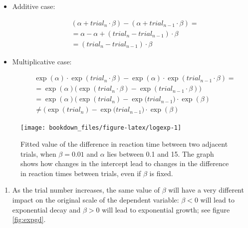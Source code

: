 \documentclass[12pt,]{krantz}
\providecommand{\tightlist}{%
  \setlength{\itemsep}{0pt}\setlength{\parskip}{0pt}}
\theoremstyle{definition}
\theoremstyle{definition}
\theoremstyle{definition}
\theoremstyle{remark}
\begin{document}
\begin{itemize}
\item
  Additive case:

  \begin{equation}
   \begin{aligned}
   & (\alpha + trial_n \cdot \beta) - (\alpha + trial_{n-1} \cdot \beta) = \\
   &=\alpha -\alpha + ( trial_n - trial_{n-1} ) \cdot \beta\\
   &= ( trial_n - trial_{n-1} ) \cdot \beta
   \end{aligned}
   \end{equation}
\item
  Multiplicative case:

  \begin{equation}
   \begin{aligned}
      &\exp(\alpha) \cdot \exp(trial_n \cdot \beta) -\exp(\alpha) \cdot \exp(trial_{n-1} \cdot \beta) =\\ 
      &= \exp(\alpha) \big(\exp(trial_n  \cdot \beta)  - \exp(trial_{n-1}\cdot \beta) \big)\\
      &= \exp(\alpha) \big(\exp(trial_n)  - \exp(trial_{n-1}  \big) \cdot \exp(\beta)\\
      &\neq \big(\exp(trial_n)  - \exp(trial_{n-1}  \big) \cdot \exp(\beta) 
   \end{aligned}
      \end{equation}
\end{itemize}






\begin{figure}[H]
  \texttt{[image: bookdown\_files/figure-latex/logexp-1]} \caption{Fitted value of the difference in reaction time between two
adjacent trials, when \(\beta=0.01\) and \(\alpha\) lies between 0.1 and
15. The graph shows how changes in the intercept lead to changes in the
difference in reaction times between trials, even if \(\beta\) is fixed.}\label{fig:logexp}
  \end{figure}

\begin{enumerate}
\def\labelenumi{\arabic{enumi}.}
\setcounter{enumi}{1}
\tightlist
\item
  As the trial number increases, the same value of \(\beta\) will have a
  very different impact on the original scale of the dependent variable:
  \(\beta <0\) will lead to exponential decay and \(\beta >0\) will lead
  to exponential growth; see figure \ref{fig:expgd}.
\end{enumerate}
\end{document}
